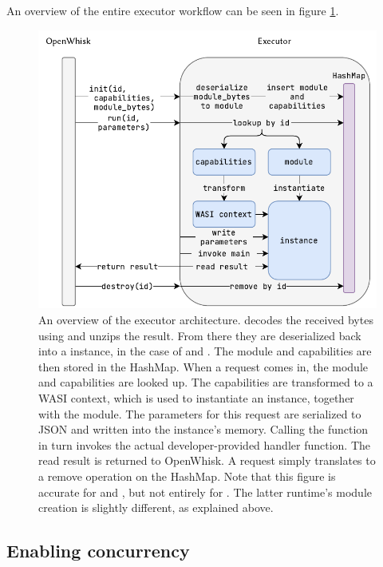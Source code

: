 An overview of the entire executor workflow can be seen in figure \ref{fig:executor-overview}.

\begin{figure}
    \centering
    \includegraphics{figures/ExecutorOverview.pdf}
    \caption{An overview of the executor architecture.  decodes the received bytes using  and unzips the result. From there they are deserialized back into a  instance, in the case of  and . The module and capabilities are then stored in the HashMap. When a  request comes in, the module and capabilities are looked up. The capabilities are transformed to a WASI context, which is used to instantiate an instance, together with the module. The parameters for this  request are serialized to JSON and written into the instance's memory. Calling the  function in turn invokes the actual developer-provided handler function. The read result is returned to OpenWhisk. A  request simply translates to a remove operation on the HashMap. Note that this figure is accurate for  and , but not entirely for . The latter runtime's module creation is slightly different, as explained above.}
    \label{fig:executor-overview}
\end{figure}



\subsection{Enabling concurrency}

